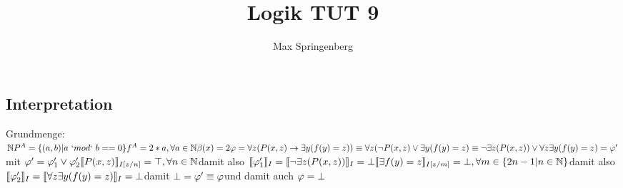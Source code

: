 \documentclass{article}
\author{Max Springenberg}
\title{Logik TUT 9}
\begin{document}
\maketitle
\newpage

\subsection{Interpretation}
Grundmenge: 
$
\mathbb{N}\\
P^A = \{(a,b) | a\ `mod`\ b == 0\}\\
f^A = 2 * a, \forall a \in \mathbb{N}\\
\beta (x) = 2\\
\\
\varphi =   \forall z (P(x,z) \rightarrow \exists y (f(y) = z))\\
\equiv      \forall z (\neg P(x,z) \lor \exists y (f(y) = z)\\
\equiv      \neg \exists z (P(x,z)) \lor \forall z \exists y (f(y) = z)
= \varphi'\\
\\
\\
$mit $
\varphi' = \varphi'_1 \lor \varphi'_2\\
\\
\llbracket P(x,z) \rrbracket_{I[z/n]} = \top, \forall n \in \mathbb{N}\\
$damit also $
    \llbracket \varphi'_1 \rrbracket_I 
=   \llbracket \neg \exists z (P(x,z)) \rrbracket_I
=   \bot\\
\\
    \llbracket \exists f(y) 
=   z \rrbracket_{I[z/m]} 
=   \bot, \forall m \in \{2n - 1 | n \in \mathbb{N}\}\\
$damit also $
    \llbracket \varphi'_2 \rrbracket_I
=   \llbracket \forall z \exists y (f(y) = z) \rrbracket_I
=   \bot\\
\\
$damit $\bot = \varphi' \equiv \varphi\\
$und damit auch $ \varphi = \bot\\
$
\newpage
\end{document}
